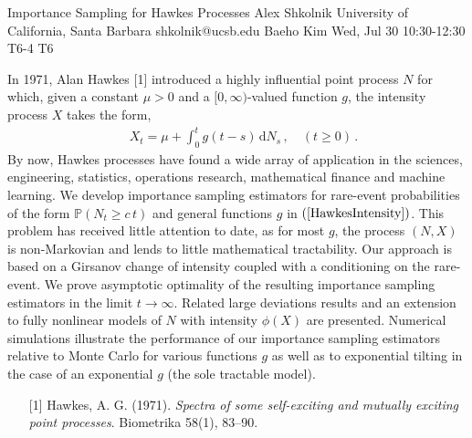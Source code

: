 \begin{talk}
  {Importance Sampling for Hawkes Processes}%
  {Alex Shkolnik}%
  {University of California, Santa Barbara}%
  {shkolnik@ucsb.edu}%
  {Baeho Kim}%
  {}%
  {Wed, Jul 30 10:30-12:30}%
  {T6-4}%
  {T6}%
  
				
			
In 1971, Alan Hawkes [1] introduced a highly influential point
process $N$ for which, given a constant $\mu > 0$ and a
$[0,\infty)$-valued function $g$, the intensity process $X$
takes the form,
\begin{align} \label{HawkesIntensity} 
 \quad X_t = \mu + \int_0^t g(t-s) \, \mathrm{d} N_s \, ,
 \quad (t \ge 0) \, .
\end{align}
By now, Hawkes processes have found a wide array of application
in the sciences, engineering, statistics, operations research,
mathematical finance and machine learning. We develop importance
sampling estimators for rare-event probabilities of the form
$\mathbb{P}(N_t \ge c \, t)$ and general functions $g$ in
$(\ref{HawkesIntensity})$. This problem has received little 
attention to
date, as for most $g$, the process $(N,X)$ is
non-Markovian and lends to little mathematical tractability.
Our approach is based on a Girsanov change of intensity coupled
with a conditioning on the rare-event.  We prove asymptotic
optimality of the resulting importance sampling estimators in
the limit $t \to \infty$. Related large deviations results and
an extension to fully nonlinear models of $N$ with intensity
$\phi(X)$ are presented.  Numerical simulations illustrate the
performance of our importance sampling estimators relative to
Monte Carlo for various functions $g$ as well as to exponential
tilting in the case of an exponential $g$ (the sole tractable
model).


\medskip


\begin{enumerate}
	\item[{[1]}] Hawkes, A. G. (1971). {\it Spectra of some 
self-exciting and mutually exciting point processes}. 
Biometrika 58(1), 83–90.
\end{enumerate}


\end{talk}


